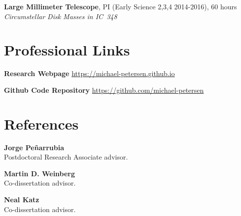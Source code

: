 \documentclass[margin, a4paper,11pt]{res} %
\begin{document}
\begin{resume}
{\bf Large Millimeter Telescope}, PI (Early Science 2,3,4 2014-2016), 60 hours\\
{\it Circumstellar Disk Masses in IC~348}








\section{\sc \textcolor{redshade}{Professional Links}}
{\bf Research Webpage} \url{https://michael-petersen.github.io}

{\bf Github Code Repository} \url{https://github.com/michael-petersen}


\section{\sc \textcolor{redshade}{References}}

{\bf Jorge Pe{\~n}arrubia}\\
Postdoctoral Research Associate advisor.

{\bf Martin D. Weinberg}\\
Co-dissertation advisor.

{\bf Neal Katz}\\
Co-dissertation advisor.


\pagebreak




\end{resume}
\end{document}
